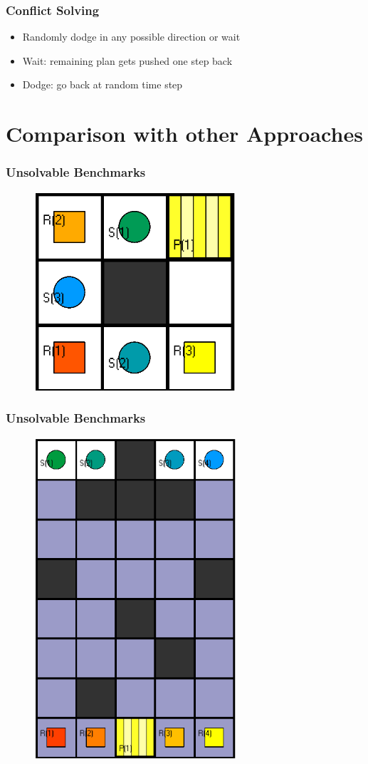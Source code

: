 \documentclass{beamer}
\begin{document}
\begin{frame}
\frametitle{Conflict Solving}
\begin{itemize}
\item<2-> Randomly dodge in any possible direction or wait
\item<3-> Wait: remaining plan gets pushed one step back
\item<4-> Dodge: go back at random time step  
\end{itemize}
\end{frame}

\section{Comparison with other Approaches}
\begin{frame}
\frametitle{Unsolvable Benchmarks}
\begin{figure}
\includegraphics[width=75mm]{Images/Instance 1}
\end{figure}
\end{frame}

\begin{frame}
\frametitle{Unsolvable Benchmarks}
\begin{figure}
\includegraphics[width=75mm]{Images/Instance 2}
\end{figure}
\end{frame}
\end{document}

